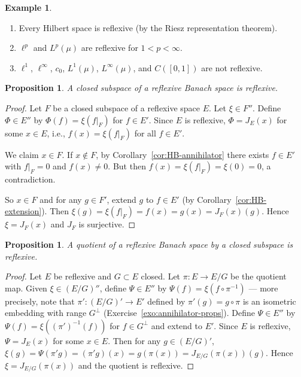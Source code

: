 \documentclass[a4paper,12pt]{book}
\theoremstyle{definition}
\newtheorem{example}[definition]{Example}
\theoremstyle{plain}
\newtheorem{proposition}[definition]{Proposition}
\theoremstyle{remark}
\begin{document}
\begin{example}\label{ex:reflexive-examples}
\begin{enumerate}[label=(\roman*)]
  \item Every Hilbert space is reflexive (by the Riesz representation theorem).
  \item $\ell^p$ and $L^p(\mu)$ are reflexive for $1<p<\infty$.
  \item $\ell^1$, $\ell^\infty$, $c_0$, $L^1(\mu)$, $L^\infty(\mu)$, and
        $C([0,1])$ are not reflexive.
\end{enumerate}
\end{example}

\begin{proposition}\label{prop:reflexive-closed-subspace}
A closed subspace of a reflexive Banach space is reflexive.
\end{proposition}

\begin{proof}
Let $F$ be a closed subspace of a reflexive space $E$. Let $\xi\in F''$. Define
$\Phi\in E''$ by $\Phi(f) = \xi(f|_F)$ for $f\in E'$. Since $E$ is reflexive,
$\Phi=J_E(x)$ for some $x\in E$, i.e., $f(x)=\xi(f|_F)$ for all $f\in E'$.

We claim $x\in F$. If $x\notin F$, by Corollary~\ref{cor:HB-annihilator} there
exists $f\in E'$ with $f|_F=0$ and $f(x)\neq 0$. But then
$f(x)=\xi(f|_F)=\xi(0)=0$, a contradiction.

So $x\in F$ and for any $g\in F'$, extend $g$ to $f\in E'$ (by
Corollary~\ref{cor:HB-extension}). Then $\xi(g) = \xi(f|_F) = f(x) = g(x) = J_F(x)(g)$.
Hence $\xi = J_F(x)$ and $J_F$ is surjective.
\end{proof}

\begin{proposition}\label{prop:reflexive-quotient}
A quotient of a reflexive Banach space by a closed subspace is reflexive.
\end{proposition}

\begin{proof}
Let $E$ be reflexive and $G\subset E$ closed. Let $\pi\colon E\to E/G$ be the
quotient map. Given $\xi\in(E/G)''$, define $\Psi\in E''$ by $\Psi(f)=\xi(f\circ\pi^{-1})$
--- more precisely, note that $\pi'\colon(E/G)'\to E'$ defined by
$\pi'(g)=g\circ\pi$ is an isometric embedding with range $G^\perp$
(Exercise~\ref{exo:annihilator-props}). Define $\Psi\in E''$ by
$\Psi(f)=\xi((\pi')^{-1}(f))$ for $f\in G^\perp$ and extend to $E'$.
Since $E$ is reflexive, $\Psi=J_E(x)$ for some $x\in E$. Then for any
$g\in(E/G)'$, $\xi(g)=\Psi(\pi'g)=(\pi'g)(x)=g(\pi(x))=J_{E/G}(\pi(x))(g)$.
Hence $\xi=J_{E/G}(\pi(x))$ and the quotient is reflexive.
\end{proof}
\end{document}
